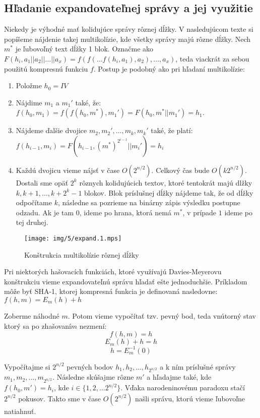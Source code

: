 \subsection{Hľadanie expandovateľnej správy a jej využitie}

Niekedy je výhodné mať kolidujúce správy rôznej dĺžky. 
V nasledujúcom texte si popíšeme nájdenie takej multikolízie,
kde všetky správy majú rôzne dĺžky. Nech $m^*$ je ľubovoľný
text dĺžky 1 blok.
Označme ako $F(h_i, a_1||a_2||\dots||a_x) = f(f(\dots f(h_i, a_1), a_2), \dots, a_x)$,
teda viackrát za sebou použitú kompresnú funkciu $f$.
Postup je podobný ako pri hľadaní multikolízie:
\begin{enumerate}
\itemsep -1.2mm
\item Položme $h_0 = IV$
\item Nájdime $m_1$ a $m_1'$ také, že: $f(h_0, m_1) = f(f(h_0, m^*), m_1') = F(h_0, m^*||m_1') = h_1$. 
\item Nájdeme ďalšie dvojice $m_2, m_2', \dots, m_k, m_k'$ také, že platí:
$f(h_{i-1}, m_i) = F(h_{i-1}, (m^*)^{2^{i-1}}||m_i') = h_i$
\item Každú dvojicu vieme nájsť v čase $O(2^{n/2})$. Celkový čas bude $O(k 2^{n/2})$.
Dostali sme opäť $2^k$ rôznych kolidujúcich textov, ktoré tentokrát 
majú dlžky $k, k+1, \dots, k+2^k-1$ blokov. 
Blok príslušnej dĺžky nájdeme tak, že od dĺžky odpočítame $k$, následne
sa pozrieme na binárny zápis výsledku postupne odzadu. Ak je tam $0$, ideme
po hrana, ktorá nemá $m^*$, v prípade $1$ ideme po tej druhej.
\end{enumerate}

\begin{figure}[h!]
    \centering
    \texttt{[image: img/5/expand.1.mps]}
    \caption{Konštrukcia multikolízie rôznej dĺžky}
    \label{fig:expand1}
\end{figure}


Pri niektorých hašovacích funkciách, ktoré využívajú
Davies-Meyerovu konštrukciu vieme expandovateľnú správu hľadať
ešte jednoduchšie. Príkladom môže byť SHA-1, ktorej kompresná funkcia
je definovaná nasledovne:
$f(h, m) = E_m(h)+h$

Zoberme náhodné $m$. Potom vieme vypočítať tzv. pevný bod, teda vnútorný
stav ktorý sa po \clqq zhašovaní\crqq $m$ nezmení:
$$f(h,m) = h$$
$$E_m(h) + h= h$$
$$h = E_m^{-1}(0)$$

Vypočítajme si $2^{n/2}$ pevných bodov $h_1, h_2, \dots, h_{2^{n/2}}$ a k ním príslušné správy
$m_1, m_2, \dots, m_{2^{n/2}}$. 
Následne skúšajme rôzne $m'$ a hľadajme také, kde $f(h_0, m') = h_i$, kde $i \in \{1, 2, \dots 2^{n/2}\}$.
Vďaka narodeninovému paradoxu stačí $2^{n/2}$ pokusov. Takto sme v čase $O(2^{n/2})$ našli správu, ktorú
vieme ľubovoľne natiahnuť.


